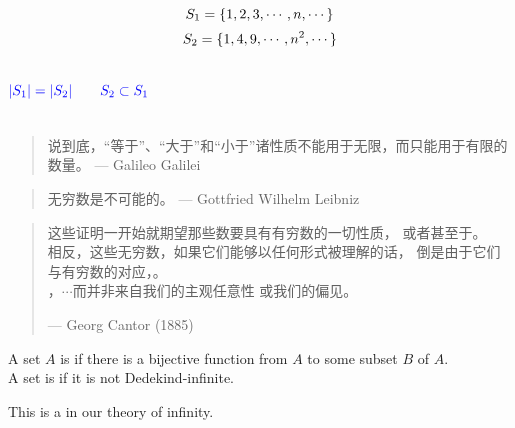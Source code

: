 \begin{frame}{}
  \[
    S_1 = \{1, 2, 3, \cdots, n, \cdots\}
  \]
  \[
    S_2 = \{1, 4, 9, \cdots, n^2, \cdots\}
  \]

  \begin{columns}
      \pause
      \[
	\textcolor{blue}{|S_1| = |S_2| \qquad S_2 \subset S_1}
      \]

      \pause
      \begin{center}
	{}
      \end{center}
      \pause
  \end{columns}

  \pause
  \vspace{0.80cm}
  \begin{quote}
    说到底，``等于''、``大于''和``小于''诸性质不能用于无限，而只能用于有限的数量。 \hfill --- Galileo Galilei
  \end{quote}

  \pause
  \vspace{0.20cm}
  \begin{quote}
    无穷数是不可能的。 \hfill --- Gottfried Wilhelm Leibniz
  \end{quote}
\end{frame}

\begin{frame}{}
  \begin{quote}
    这些证明一开始就期望那些数要具有有穷数的一切性质，
    或者甚至于。\pause \\[15pt]

    相反，这些无穷数，如果它们能够以任何形式被理解的话，
    倒是由于它们与有穷数的对应，。\pause \\[15pt]

    ，$\cdots$而并非来自我们的主观任意性
    或我们的偏见。

    \hfill --- Georg Cantor (1885)
  \end{quote}
\end{frame}

\begin{frame}{}
  \begin{definition}
    A set $A$ is 
    if there is a bijective function from $A$ to some  subset $B$ of $A$. \\[8pt]

    A set is  if it is not Dedekind-infinite.
  \end{definition}

  \pause

  \begin{center}
    This is a  in our theory of infinity.
  \end{center}
\end{frame}


